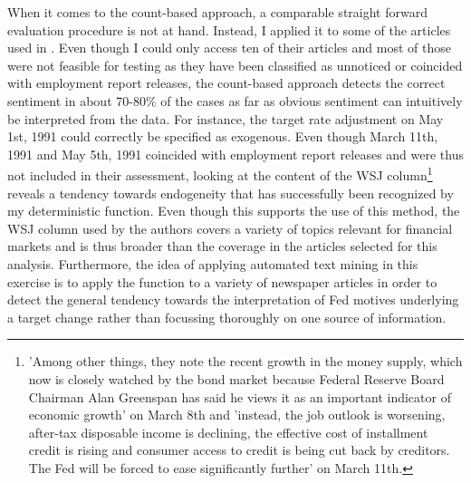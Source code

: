 When it comes to the count-based approach, a comparable straight forward evaluation procedure is not at hand. Instead, I applied it to some of the articles used in \textcite{Ellingsen.2003}. Even though I could only access ten of their articles and most of those were not feasible for testing as they have been classified as unnoticed or coincided with employment report releases, the count-based approach detects the correct sentiment in about 70-80\% of the cases as far as obvious sentiment can intuitively be interpreted from the data. 
%
For instance, the target rate adjustment on May 1st, 1991 could correctly be specified as exogenous. Even though March 11th, 1991 and May 5th, 1991 coincided with employment report releases and were thus not included in their assessment, looking at the content of the WSJ column\footnote{'Among other things, they note the recent growth in the money supply, which now is closely watched by the bond market because Federal Reserve Board Chairman Alan Greenspan has said he views it as an important indicator of economic growth' on March 8th and 'instead, the job outlook is worsening, after-tax disposable income is declining, the effective cost of installment credit is rising and consumer access to credit is being cut back by creditors. The Fed will be forced to ease significantly further' on March 11th.} reveals a tendency towards endogeneity that has successfully been recognized by my deterministic function.
%
Even though this supports the use of this method, the WSJ column used by the authors covers a variety of topics relevant for financial markets and is thus broader than the coverage in the articles selected for this analysis. Furthermore, the idea of applying automated text mining in this exercise is to apply the function to a variety of newspaper articles in order to detect the general tendency towards the interpretation of Fed motives underlying a target change rather than focussing thoroughly on one source of information.
% 
